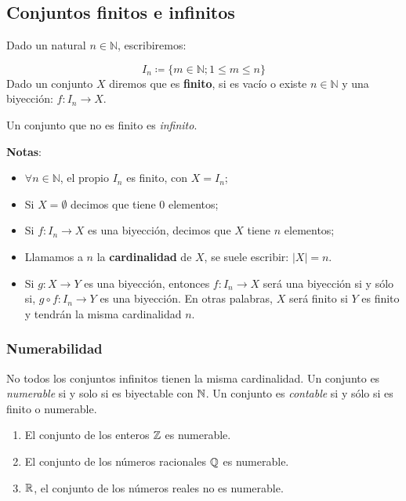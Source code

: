 \subsection{Conjuntos finitos e infinitos} \label{sec:finitos}  
\vspace{1em}
\begin{fmd-definition}
	Dado un natural $n \in \mathbb{N}$, escribiremos:
	
	\[ I_n \coloneqq \{ m \in \mathbb{N}; 1 \le m \le n\} \]
	Dado un conjunto $X$ diremos que es \textbf{finito}, si es vacío o existe $n \in \mathbb{N}$ y una biyección: $f: I_n \rightarrow X$.
	
	Un conjunto que no es finito es \textit{infinito}.
\end{fmd-definition}

\textbf{Notas}:
\begin{itemize}
	\item $\forall n \in \mathbb{N} $, el propio $I_n$ es finito, con $X = I_n$;
	\item Si $X = \emptyset$ decimos que tiene 0 elementos;
	\item Si $f: I_n \rightarrow X$ es una biyección, decimos que $X$ tiene $n$ elementos;
	\item Llamamos a $n$ la \textbf{cardinalidad} de $X$, se suele escribir: $|X| = n$.
	\item Si $g: X \rightarrow Y$ es una biyección, entonces $f:I_n \rightarrow X$ será una biyección si y sólo si, $g \circ f:I_n \rightarrow Y$ es una biyección. En otras palabras, $X$ será finito si $Y$ es finito y tendrán la misma cardinalidad $n$.
\end{itemize}

\subsubsection{Numerabilidad}
No todos los conjuntos infinitos tienen la misma cardinalidad. Un conjunto es \textit{numerable} si y solo si es biyectable con $\mathbb{N}$. Un conjunto es \textit{contable} si y sólo si es finito o numerable.

\begin{fmd-example}
	\begin{enumerate}
		\item El conjunto de los enteros $\mathbb{Z}$ es numerable.
		\item El conjunto de los números racionales $\mathbb{Q}$ es numerable.
		\item $\mathbb{R}$, el conjunto de los números reales no es numerable.
	\end{enumerate}
\end{fmd-example}

